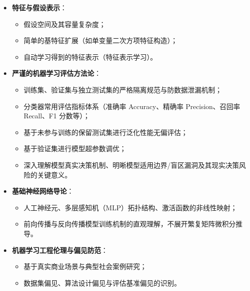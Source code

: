\begin{itemize}
\begin{itemize}
        \item 数据归一化与标准化（Min-Max 缩放与 Z-score 标准化）；
        \item 坚决强调面对真实世界脏数据的处理实战，而非理想化的人工教材玩具数据。
    \end{itemize}
    \item \textbf{特征与假设表示}：
    \begin{itemize}
        \item 假设空间及其容量复杂度；
        \item 简单的基特征扩展（如单变量二次方项特征构造）；
        \item 自动学习得到的特征表示（特征表示学习）。
    \end{itemize}
    \item \textbf{严谨的机器学习评估方法论}：
    \begin{itemize}
        \item 训练集、验证集与独立测试集的严格隔离规范与防数据泄漏机制；
        \item 分类器常用评估指标体系（准确率 Accuracy、精确率 Precision、召回率 Recall、F1 分数等）；
        \item 基于未参与训练的保留测试集进行泛化性能无偏评估；
        \item 基于验证集进行模型超参数调优；
        \item 深入理解模型真实决策机制、明晰模型适用边界/盲区漏洞及其现实决策风险的关键意义。
    \end{itemize}
    \item \textbf{基础神经网络导论}：
    \begin{itemize}
        \item 人工神经元、多层感知机（MLP）拓扑结构、激活函数的非线性映射；
        \item 前向传播与反向传播模型训练机制的直观理解，不展开繁复矩阵微积分推导。
    \end{itemize}
    \item \textbf{机器学习工程伦理与偏见防范}：
    \begin{itemize}
        \item 基于真实商业场景与典型社会案例研究；
        \item 数据集偏见、算法设计偏见与评估基准偏见的识别。
    \end{itemize}
\end{itemize}

